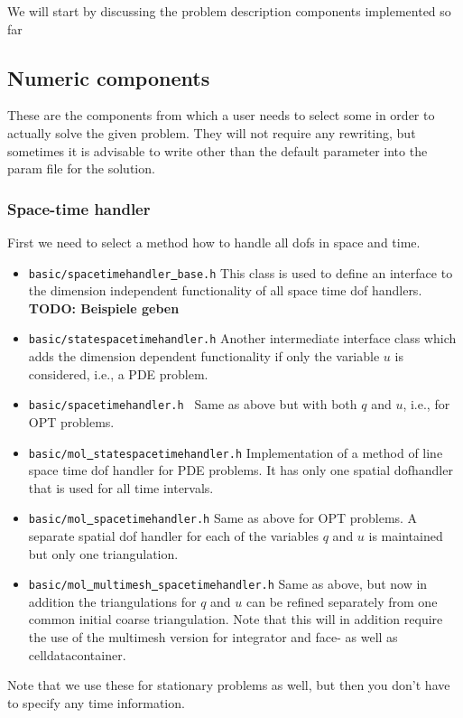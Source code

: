 We will start by discussing the problem description components implemented so far


\subsection{Numeric components}
These are the components from which a user needs to select some in order to actually 
solve the given problem. They will not require any rewriting, but sometimes it is 
advisable to write other than the default parameter into the param file for the 
solution.

\subsubsection{Space-time handler}
First we need to select a method how to handle all dofs in space and time.
\begin{itemize}
\item \texttt{basic/spacetimehandler\underline{ }base.h} This class is used to define 
  an interface to the dimension independent functionality of all space time dof handlers.
  {\bf TODO: Beispiele geben}
\item \texttt{basic/statespacetimehandler.h} Another intermediate interface class which adds 
  the dimension dependent functionality if only the variable $u$ is considered, i.e., a 
  PDE problem.
\item \texttt{basic/spacetimehandler.h } Same as above but with both $q$ and $u$, i.e., for
  OPT problems.
\item \texttt{basic/mol\underline{ }statespacetimehandler.h} Implementation of a method of 
  line space time dof handler for PDE problems. It has only one spatial 
  dofhandler that is used for all time intervals.
\item \texttt{basic/mol\underline{ }spacetimehandler.h} Same as above for OPT problems.
  A separate spatial dof handler for each of the variables $q$ and $u$ is maintained 
  but only one triangulation.
\item \texttt{basic/mol\underline{ }multimesh\underline{ }spacetimehandler.h}
  Same as above, but now in addition the triangulations for $q$ and $u$ can be refined
  separately from one common initial coarse triangulation. Note that this will
  in addition require the use of the multimesh version for integrator and 
  face- as well as celldatacontainer.
\end{itemize}
Note that we use these for stationary problems as well, but then you don't have to specify
any time information.

